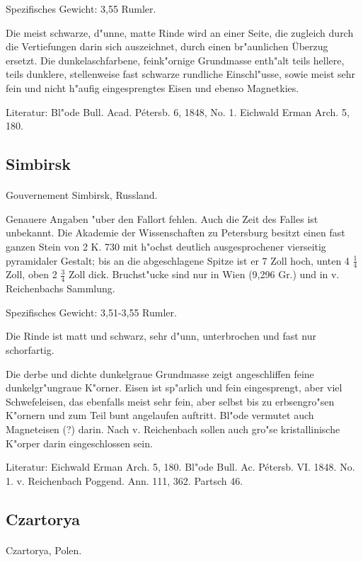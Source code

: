 \documentclass[a4paper, 11pt, oneside]{article}
\begin{document}
Spezifisches Gewicht: 3,55 Rumler.

Die meist schwarze, d"unne, matte Rinde wird an einer Seite, die zugleich durch die Vertiefungen darin sich auszeichnet, durch einen br"aunlichen Überzug ersetzt. Die dunkelaschfarbene, feink"ornige Grundmasse enth"alt teils hellere, teils dunklere, stellenweise fast schwarze rundliche Einschl"usse, sowie meist sehr fein und nicht h"aufig eingesprengtes Eisen und ebenso Magnetkies.

Literatur: Bl"ode Bull. Acad. Pétersb. 6, 1848, No. 1. Eichwald Erman Arch. 5, 180.

\subsection{Simbirsk}
\normalsize
\paragraph{}
Gouvernement Simbirsk, Russland.

Genauere Angaben "uber den Fallort fehlen. Auch die Zeit des Falles ist unbekannt. Die Akademie der Wissenschaften zu Petersburg besitzt einen fast ganzen Stein von 2 K. 730 mit h"ochst deutlich ausgesprochener vierseitig pyramidaler Gestalt; bis an die abgeschlagene Spitze ist er 7 Zoll hoch, unten 4 $\frac{1}{4}$ Zoll, oben 2 $\frac{3}{4}$ Zoll dick. Bruchst"ucke sind nur in Wien (9,296 Gr.) und in v. Reichenbachs Sammlung.

Spezifisches Gewicht: 3,51-3,55 Rumler.

Die Rinde ist matt und schwarz, sehr d"unn, unterbrochen und fast nur schorfartig.

Die derbe und dichte dunkelgraue Grundmasse zeigt angeschliffen feine dunkelgr"ungraue K"orner. Eisen ist sp"arlich und fein eingesprengt, aber viel Schwefeleisen, das ebenfalls meist sehr fein, aber selbst bis zu erbsengro"sen K"ornern und zum Teil bunt angelaufen auftritt. Bl"ode vermutet auch Magneteisen (?) darin. Nach v. Reichenbach sollen auch gro"se kristallinische K"orper darin eingeschlossen sein.

Literatur: Eichwald Erman Arch. 5, 180. Bl"ode Bull. Ac. Pétersb. VI. 1848. No. 1. v. Reichenbach Poggend. Ann. 111, 362. Partsch 46.

\subsection{Czartorya}
\normalsize
\paragraph{}
Czartorya, Polen.
\end{document}
